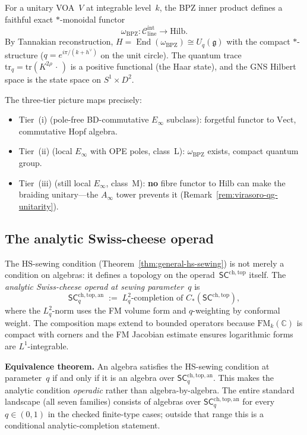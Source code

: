 \documentclass[11pt]{article}
\newcommand{\cC}{\mathcal{C}}
\newcommand{\fg}{\mathfrak{g}}
\newcommand{\SCchtop}{\mathsf{SC}^{\mathrm{ch,top}}}
\newcommand{\FM}{\mathrm{FM}}
\newcommand{\End}{\operatorname{End}}
\providecommand{\bC}{\mathbb{C}}
\begin{document}
For a unitary VOA~$V$ at integrable level~$k$, the BPZ inner
product defines a faithful exact $*$-monoidal functor
\[
  \omega_{\mathrm{BPZ}}\colon
  \cC_{\mathrm{line}}^{\mathrm{int}} \longrightarrow \mathrm{Hilb}.
\]
By Tannakian reconstruction, $H = \End(\omega_{\mathrm{BPZ}})
\cong U_q(\fg)$ with the compact $*$-structure
($q = e^{i\pi/(k+h^\vee)}$ on the unit circle).
The quantum trace $\mathrm{tr}_q = \mathrm{tr}(K^{2\rho}\,
\cdot\,)$ is a positive functional (the Haar state), and the
GNS Hilbert space is the state space on
$S^1 \times D^2$.

The three-tier picture maps precisely:
\begin{itemize}[nosep]
\item Tier~(i) (pole-free BD-commutative $E_\infty$ subclass): forgetful functor to
  $\mathrm{Vect}$, commutative Hopf algebra.
\item Tier~(ii) (local $E_\infty$ with OPE poles, class~L): $\omega_{\mathrm{BPZ}}$
  exists, compact quantum group.
\item Tier~(iii) (still local $E_\infty$, class~M): \textbf{no} fibre functor to
  $\mathrm{Hilb}$ can make the braiding unitary---the
  $A_\infty$ tower prevents it
  (Remark~\ref{rem:virasoro-qg-unitarity}).
\end{itemize}

\subsection{The analytic Swiss-cheese operad}
\label{sec:analytic-sc-operad}

The HS-sewing condition
(Theorem~\ref*{thm:general-hs-sewing})
is not merely a condition on algebras: it defines a topology
on the operad~$\SCchtop$ itself.  The \emph{analytic
Swiss-cheese operad at sewing parameter~$q$} is
\[
  \mathsf{SC}^{\mathrm{ch,top,an}}_q
  \;:=\;
  L^2_q\text{-completion of }
  C_*(\SCchtop),
\]
where the $L^2_q$-norm uses the FM volume form and
$q$-weighting by conformal weight.  The composition maps
extend to bounded operators because $\FM_k(\bC)$ is compact
with corners and the FM Jacobian estimate ensures logarithmic
forms are $L^1$-integrable.

\textbf{Equivalence theorem.}
An algebra satisfies the HS-sewing condition at
parameter~$q$ if and only if it is an algebra over
$\mathsf{SC}^{\mathrm{ch,top,an}}_q$.  This makes the analytic
condition \emph{operadic} rather than algebra-by-algebra.
The entire standard landscape (all seven families) consists
of algebras over $\mathsf{SC}^{\mathrm{ch,top,an}}_q$ for every
  $q \in (0,1)$ in the checked finite-type cases; outside that
  range this is a conditional analytic-completion statement.
\end{document}

